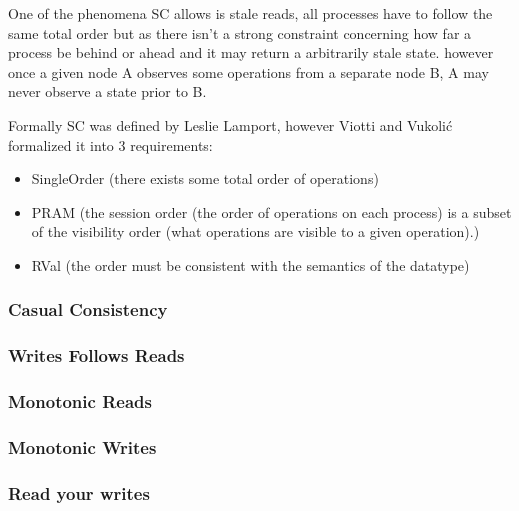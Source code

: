 \documentclass[a4paper,10pt,titlepage]{report}
\begin{document}
    One of the phenomena SC allows is stale reads, all processes have to follow the same total order but as there isn't a strong constraint concerning how far a process be behind or ahead and it may return a arbitrarily stale state. however once a given node A observes some operations from a separate node B, A may never observe a state prior to B.

    Formally SC was defined by Leslie Lamport\cite{Lamport1979how}, however Viotti and Vukolić\cite{ConsistencyinNonTransactionalDistributedStorageSystems} formalized it into 3 requirements:
    \begin{itemize}
        \item SingleOrder (there exists some total order of operations)
        \item PRAM (the session order (the order of operations on each process) is a subset of the visibility order (what operations are visible to a given operation).)
        \item RVal (the order must be consistent with the semantics of the datatype)
    \end{itemize}


    \subsubsection{Casual Consistency}

    \subsubsection{Writes Follows Reads}

    \subsubsection{Monotonic Reads}

    \subsubsection{Monotonic Writes}

    \subsubsection{Read your writes}
\end{document}
